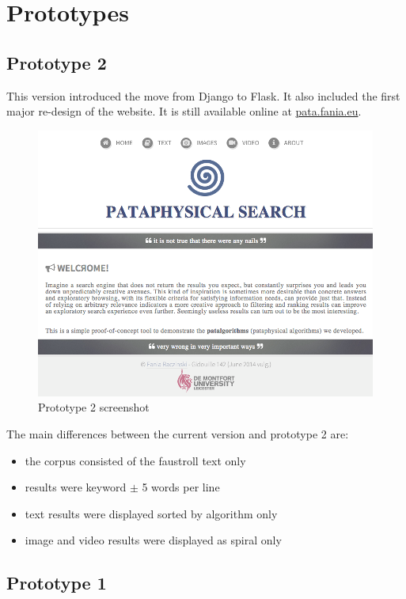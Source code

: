\section{Prototypes}


\subsection{Prototype 2}

This version introduced the move from Django to Flask. It also included the first major re-design of the website. It is still available online at \url{pata.fania.eu}.

\begin{figure}[htbp] %
  \centering
  \includegraphics[width=\linewidth]{images/prototype02}
\caption[Prototype 2 screenshot]{Prototype 2 screenshot}
\label{img:Prototype2x}
\end{figure}

The main differences between the current version and prototype 2 are:
\begin{itemize}
  \item the corpus consisted of the faustroll text only
  \item results were keyword $\pm$ 5 words per line
  \item text results were displayed sorted by algorithm only
  \item image and video results were displayed as spiral only
\end{itemize}


\subsection{Prototype 1}

